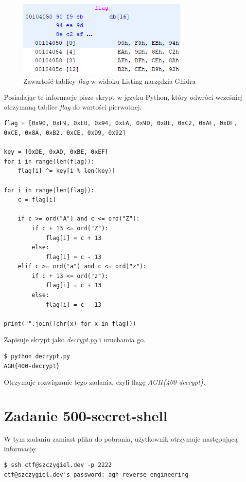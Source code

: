 \documentclass[language=polish,type=eng]{aghmodern}
\begin{document}
\begin{figure}[H]
\centering
\includegraphics{400_flag}
\caption{Zawartość tablicy \emph{flag} w widoku Listing narzędzia Ghidra}
\end{figure}

Posiadając te informacje pisze skrypt w języku Python, który odwróci wcześniej otrzymaną
tablice \emph{flag} do wartości pierwotnej.

\begin{verbatim}
flag = [0x90, 0xF9, 0xEB, 0x94, 0xEA, 0x9D, 0x8E, 0xC2, 0xAF, 0xDF, 0xCE, 0x8A, 0xB2, 0xCE, 0xD9, 0x92]

key = [0xDE, 0xAD, 0xBE, 0xEF]
for i in range(len(flag)):
    flag[i] ^= key[i % len(key)]

for i in range(len(flag)):
    c = flag[i]

    if c >= ord("A") and c <= ord("Z"):
        if c + 13 <= ord("Z"):
            flag[i] = c + 13
        else:
            flag[i] = c - 13
    elif c >= ord("a") and c <= ord("z"):
        if c + 13 <= ord("z"):
            flag[i] = c + 13
        else:
            flag[i] = c - 13

print("".join([chr(x) for x in flag]))
\end{verbatim}

Zapisuje skrypt jako \emph{decrypt.py} i uruchamia go.

\begin{verbatim}
$ python decrypt.py
AGH{400-decrypt}
\end{verbatim}

Otrzymuje rozwiązanie tego zadania, czyli flagę \emph{AGH\{400-decrypt\}}.

\section{Zadanie 500-secret-shell}

W tym zadaniu zamiast pliku do pobrania, użytkownik otrzymuje następującą informację:

\begin{verbatim}
$ ssh ctf@szczygiel.dev -p 2222
ctf@szczygiel.dev's password: agh-reverse-engineering
\end{verbatim}
\end{document}
